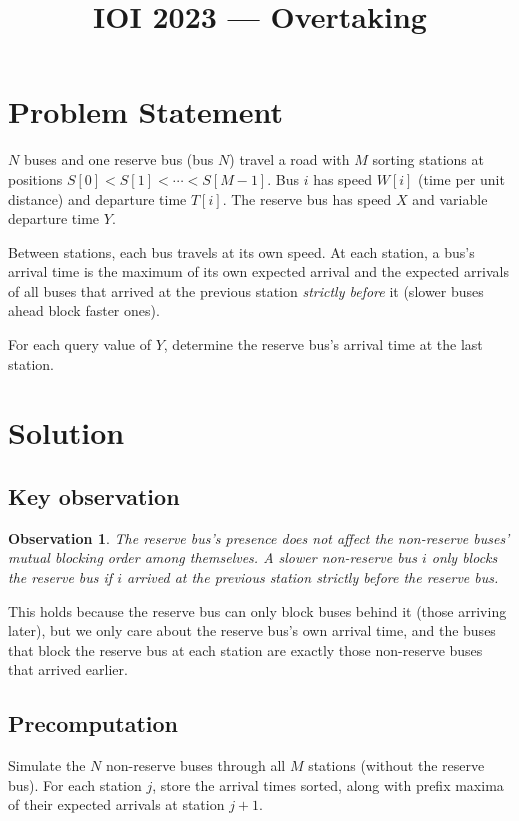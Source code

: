 \documentclass[11pt,a4paper]{article}
\title{IOI 2023 --- Overtaking}
\author{}
\date{}
\newtheorem{observation}{Observation}
\begin{document}
\maketitle

\section{Problem Statement}

$N$ buses and one reserve bus (bus $N$) travel a road with $M$ sorting
stations at positions $S[0] < S[1] < \cdots < S[M{-}1]$.  Bus $i$ has
speed $W[i]$ (time per unit distance) and departure time $T[i]$.  The
reserve bus has speed $X$ and variable departure time $Y$.

Between stations, each bus travels at its own speed.  At each station,
a bus's arrival time is the maximum of its own expected arrival and the
expected arrivals of all buses that arrived at the previous station
\emph{strictly before} it (slower buses ahead block faster ones).

For each query value of $Y$, determine the reserve bus's arrival time
at the last station.

\section{Solution}

\subsection{Key observation}

\begin{observation}
The reserve bus's presence does not affect the non-reserve buses'
mutual blocking order among themselves.  A slower non-reserve bus $i$
only blocks the reserve bus if $i$ arrived at the previous station
strictly before the reserve bus.
\end{observation}

This holds because the reserve bus can only block buses behind it (those
arriving later), but we only care about the reserve bus's own arrival
time, and the buses that block the reserve bus at each station are
exactly those non-reserve buses that arrived earlier.

\subsection{Precomputation}

Simulate the $N$ non-reserve buses through all $M$ stations (without
the reserve bus).  For each station $j$, store the arrival times sorted,
along with prefix maxima of their expected arrivals at station $j + 1$.
\end{document}
